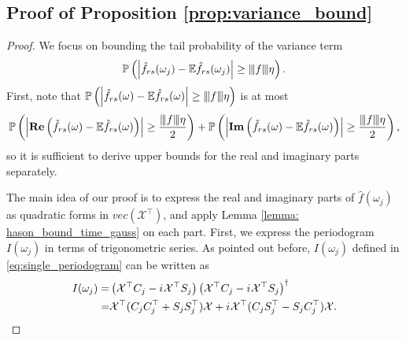 \subsection{Proof of Proposition \ref{prop:variance_bound}}
\begin{proof}
We focus on bounding the tail probability of the variance term
\begin{equation}
\mathbb{P}\left(\left|\hat{f}_{rs}(\omega_j) - \mathbb{E}\hat{f}_{rs}(\omega_j)\right| \ge {\left\vert\kern-0.25ex\left\vert\kern-0.25ex\left\vert f \right\vert\kern-0.25ex\right\vert\kern-0.25ex\right\vert}\eta\right). \nonumber
\end{equation}
First, note that $\mathbb{P}\left(\left|\hat{f}_{rs}(\omega) - \mathbb{E}\hat{f}_{rs}(\omega)\right|\ge  {\left\vert\kern-0.25ex\left\vert\kern-0.25ex\left\vert f \right\vert\kern-0.25ex\right\vert\kern-0.25ex\right\vert}\eta \right)$ is at most 
\begin{equation}
\label{eq:bound_with_real_img}
\begin{aligned}
\mathbb{P}\left(\left|\mathbf{Re}\left(\hat{f}_{rs}(\omega) - \mathbb{E}\hat{f}_{rs}(\omega)\right)\right|\ge \frac{{\left\vert\kern-0.25ex\left\vert\kern-0.25ex\left\vert f \right\vert\kern-0.25ex\right\vert\kern-0.25ex\right\vert}\eta}{2} \right)  + \mathbb{P}\left(\left|\mathbf{Im}\left(\hat{f}_{rs}(\omega) - \mathbb{E}\hat{f}_{rs}(\omega)\right)\right|\ge \frac{{\left\vert\kern-0.25ex\left\vert\kern-0.25ex\left\vert f \right\vert\kern-0.25ex\right\vert\kern-0.25ex\right\vert}\eta}{2} \right),
\nonumber 
\end{aligned}
\end{equation}
so it is sufficient to derive upper bounds for the real and imaginary parts separately.\par 
The main idea of our proof is to express the real and imaginary parts of $\hat{f}(\omega_j)$ as quadratic forms in $vec(\mathcal{X}^\top)$, and apply Lemma \ref{lemma: hason_bound_time_gauss} on each part. First, we express the periodogram $I(\omega_j)$ in terms of  trigonometric series. 
As pointed out before, $I(\omega_j)$ defined in \eqref{eq:single_periodogram} can be written as 
\begin{equation}
\label{eq:realImaginaryParts}
\begin{aligned}
I(\omega_j) = & \left(\mathcal{X}^\top C_j-  {i\mkern1mu} \mathcal{X}^\top S_j\right) \left(\mathcal{X}^\top C_j-{i\mkern1mu} \mathcal{X}^\top S_j\right)^\dag \\
= & \mathcal{X}^\top (C_jC_j^\top + S_jS_j^\top)\mathcal{X} + {i\mkern1mu} \mathcal{X}^\top(C_jS_j^\top-S_jC_j^\top)\mathcal{X}. 
\end{aligned}
\end{equation}

\end{proof}
